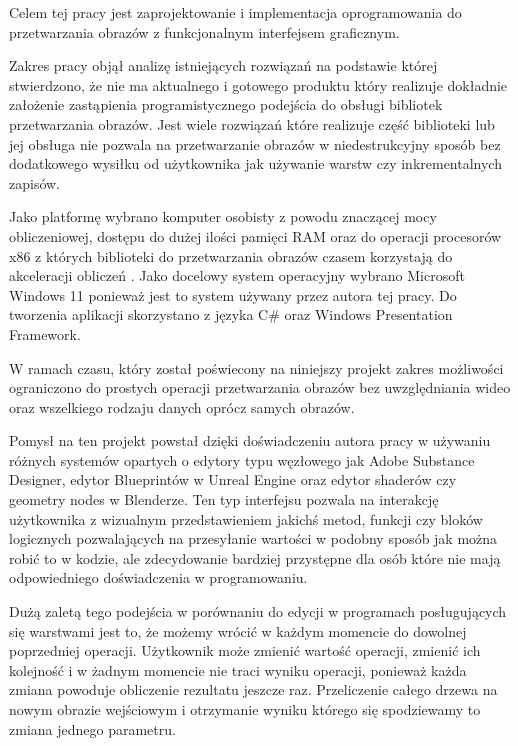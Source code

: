 Celem tej pracy jest zaprojektowanie i implementacja oprogramowania do przetwarzania obrazów z funkcjonalnym interfejsem graficznym.

Zakres pracy objął analizę istniejących rozwiązań na podstawie której stwierdzono, że nie ma aktualnego i gotowego produktu który realizuje dokładnie założenie zastąpienia programistycznego podejścia do obsługi bibliotek przetwarzania obrazów. 
Jest wiele rozwiązań które realizuje część biblioteki lub jej obsługa nie pozwala na przetwarzanie obrazów w niedestrukcyjny sposób bez dodatkowego wysiłku od użytkownika jak używanie warstw czy inkrementalnych zapisów. 

Jako platformę wybrano komputer osobisty z powodu znaczącej mocy obliczeniowej, dostępu do dużej ilości pamięci RAM oraz do operacji procesorów x86 z których biblioteki do przetwarzania obrazów czasem korzystają do akceleracji obliczeń \cite{x86opencv}. 
Jako docelowy system operacyjny wybrano Microsoft Windows 11 ponieważ jest to system używany przez autora tej pracy. 
Do tworzenia aplikacji skorzystano z języka C\# oraz Windows Presentation Framework. 

W ramach czasu, który został poświecony na niniejszy projekt zakres możliwości ograniczono do prostych operacji przetwarzania obrazów bez uwzględniania wideo oraz wszelkiego rodzaju danych oprócz samych obrazów. 

Pomysł na ten projekt powstał dzięki doświadczeniu autora pracy w używaniu różnych systemów opartych o edytory typu węzłowego jak Adobe Substance Designer, edytor Blueprintów w Unreal Engine oraz edytor shaderów czy geometry nodes w Blenderze. 
Ten typ interfejsu pozwala na interakcję użytkownika z wizualnym przedstawieniem jakichś metod, funkcji czy bloków logicznych pozwalających na przesyłanie wartości w podobny sposób jak można robić to w kodzie, ale zdecydowanie bardziej przystępne dla osób które nie mają odpowiedniego doświadczenia w programowaniu.

Dużą zaletą tego podejścia w porównaniu do edycji w programach posługujących się warstwami jest to, że możemy wrócić w każdym momencie do dowolnej poprzedniej operacji. 
Użytkownik może zmienić wartość operacji, zmienić ich kolejność i w żadnym momencie nie traci wyniku operacji, ponieważ każda zmiana powoduje obliczenie rezultatu jeszcze raz. 
Przeliczenie całego drzewa na nowym obrazie wejściowym i otrzymanie wyniku którego się spodziewamy to zmiana jednego parametru.